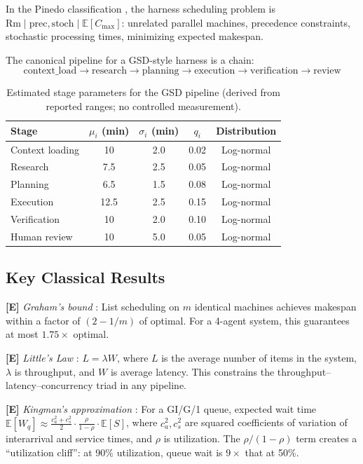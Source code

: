 \documentclass[11pt, a4paper, logo, copyright]{googledeepmind}
\newcommand{\E}{\mathbb{E}}
\begin{document}
In the Pinedo classification \citep{pinedo2016scheduling}, the harness scheduling problem is $\mathrm{Rm} \mid \mathrm{prec}, \mathrm{stoch} \mid \E[C_{\max}]$: unrelated parallel machines, precedence constraints, stochastic processing times, minimizing expected makespan.

The canonical pipeline for a GSD-style harness is a chain:
\[
    \text{context\_load} \to \text{research} \to \text{planning} \to \text{execution} \to \text{verification} \to \text{review}
\]

\begin{table}[ht]
\centering
\caption{Estimated stage parameters for the GSD pipeline (derived from reported ranges; no controlled measurement).}\label{tab:stages}
\begin{tabular}{lcccc}
\toprule
Stage & $\mu_i$ (min) & $\sigma_i$ (min) & $q_i$ & Distribution \\
\midrule
Context loading & 10 & 2.0 & 0.02 & Log-normal \\
Research & 7.5 & 2.5 & 0.05 & Log-normal \\
Planning & 6.5 & 1.5 & 0.08 & Log-normal \\
Execution & 12.5 & 2.5 & 0.15 & Log-normal \\
Verification & 10 & 2.0 & 0.10 & Log-normal \\
Human review & 10 & 5.0 & 0.05 & Log-normal \\
\bottomrule
\end{tabular}
\end{table}

\subsection{Key Classical Results}

\textbf{[E]} \emph{Graham's bound} \citep{graham1966bounds}: List scheduling on $m$ identical machines achieves makespan within a factor of $(2 - 1/m)$ of optimal. For a 4-agent system, this guarantees at most $1.75\times$ optimal.

\textbf{[E]} \emph{Little's Law} \citep{little1961proof}: $L = \lambda W$, where $L$ is the average number of items in the system, $\lambda$ is throughput, and $W$ is average latency. This constrains the throughput--latency--concurrency triad in any pipeline.

\textbf{[E]} \emph{Kingman's approximation} \citep{kingman1961single}: For a GI/G/1 queue, expected wait time $\E[W_q] \approx \frac{c_a^2 + c_s^2}{2} \cdot \frac{\rho}{1 - \rho} \cdot \E[S]$, where $c_a^2, c_s^2$ are squared coefficients of variation of interarrival and service times, and $\rho$ is utilization. The $\rho/(1-\rho)$ term creates a ``utilization cliff'': at 90\% utilization, queue wait is $9\times$ that at 50\%.
\end{document}
